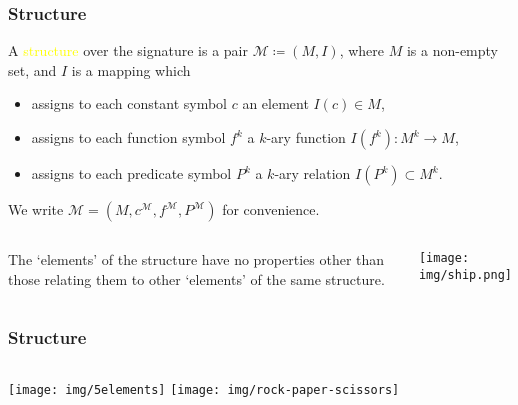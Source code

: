 \documentclass[UTF8,11pt,colorlinks,compress,openany]{beamer}%
\begin{document}
\begin{frame}\frametitle{Structure}
		A \textcolor{yellow}{structure} over the signature is a pair $\mathcal{M}\coloneqq (M,I)$, where $M$ is a non-empty set, and $I$ is a mapping which
		\begin{itemize}
			\item assigns to each constant symbol $c$ an element $I(c)\in M$,
			\item assigns to each function symbol $f^k$ a $k$-ary function $I(f^k): M^k\to M$,
			\item assigns to each predicate symbol $P^k$ a $k$-ary relation $I(P^k)\subset M^k$.
		\end{itemize}
		We write $\mathcal{M}=\left(M,c^{\mathcal{M}},f^{\mathcal{M}},P^{\mathcal{M}}\right)$ for convenience.
		\begin{columns}
				\begin{block}{}
					The `elements' of the structure have no properties other than those relating them to other `elements' of the same structure.
				\end{block}
				\centering\texttt{[image: img/ship.png]}
		\end{columns}
\end{frame}

\begin{frame}\frametitle{Structure}
		\begin{columns}[onlytextwidth]
		\column{.45\textwidth}
		\texttt{[image: img/5elements]}
		\column{.45\textwidth}
		\texttt{[image: img/rock-paper-scissors]}
		\end{columns}\vspace{-7ex}
				\begin{center}
				\end{center}
\end{frame}
\end{document}
